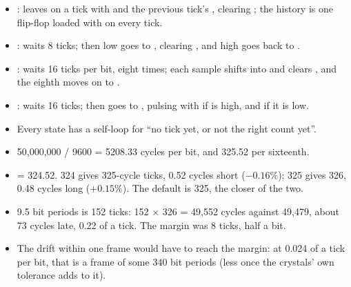 \begin{itemize}
  \item {}: leaves on a tick with  and the previous tick's
    , clearing ; the history is one flip-flop loaded with
     on every tick.
  \item {}: waits 8 ticks; then  low goes to ,
    clearing , and high goes back to .
  \item {}: waits 16 ticks per bit, eight times; each sample shifts  into
     and clears , and the eighth moves on to .
  \item {}: waits 16 ticks; then goes to , pulsing
     with  if  is high, and  if
    it is low.
  \item Every state has a self-loop for ``no tick yet, or not the right count yet''.
\end{itemize}
\begin{itemize}
  \item 50,000,000 / 9600 = 5208.33 cycles per bit, and 325.52 per sixteenth.
  \item {} = 324.52. 324 gives 325-cycle ticks, 0.52 cycles short ($-0.16\%$); 325
    gives 326, 0.48 cycles long ($+0.15\%$). The default is 325, the closer of the two.
  \item 9.5 bit periods is 152 ticks: 152 $\times$ 326 = 49,552 cycles against 49,479, about 73 cycles
    late, 0.22 of a tick. The margin was 8 ticks, half a bit.
  \item The drift within one frame would have to reach the margin: at 0.024 of a tick per bit,
    that is a frame of some 340 bit periods (less once the crystals' own tolerance adds to it).
\end{itemize}
